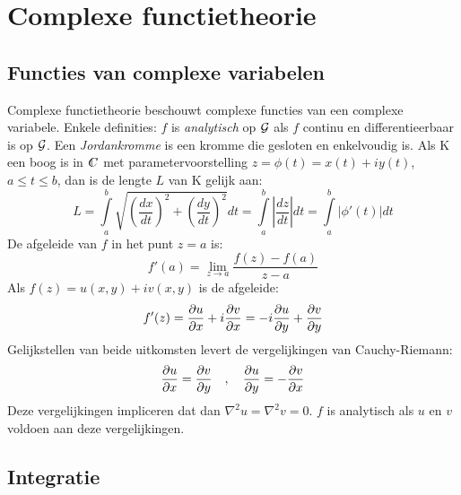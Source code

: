 \documentclass[twoside]{report}
\begin{document}
\chapter{Complexe functietheorie}
\section{Functies van complexe variabelen}
Complexe functietheorie beschouwt complexe functies van een complexe variabele.
Enkele definities:
\npar
$f$ is {\it analytisch} op $\cal G$ als $f$ continu en differentieerbaar is
op $\cal G$.
\npar
Een {\it Jordankromme} is een kromme die gesloten en enkelvoudig is.
\npar
Als K een boog is in $\CC$ met parametervoorstelling $z=\phi(t)=x(t)+iy(t)$,
$a\leq t\leq b$, dan is de lengte $L$ van K gelijk aan:
\[
L=\int\limits_a^b \sqrt{\left(\frac{dx}{dt}\right)^2+\left(\frac{dy}{dt}\right)^2}dt=
\int\limits_a^b\left|\frac{dz}{dt}\right|dt=\int\limits_a^b|\phi'(t)|dt
\]
De afgeleide van $f$ in het punt $z=a$ is:
\[
f'(a)=\lim_{z\rightarrow a}\frac{f(z)-f(a)}{z-a}
\]
Als $f(z)=u(x,y)+iv(x,y)$ is de afgeleide:
\[
f'(z)=\frac{\partial u}{\partial x}+i\frac{\partial v}{\partial x}=-i\frac{\partial u}{\partial y}+\frac{\partial v}{\partial y}
\]
Gelijkstellen van beide uitkomsten levert de vergelijkingen van Cauchy-Riemann:
\[
\frac{\partial u}{\partial x}=\frac{\partial v}{\partial y}~~~,~~~\frac{\partial u}{\partial y}=-\frac{\partial v}{\partial x}
\]
Deze vergelijkingen impliceren dat dan $\nabla^2u=\nabla^2v=0$.
$f$ is analytisch als $u$ en $v$ voldoen aan deze vergelijkingen.

\section{Integratie}
\end{document}
